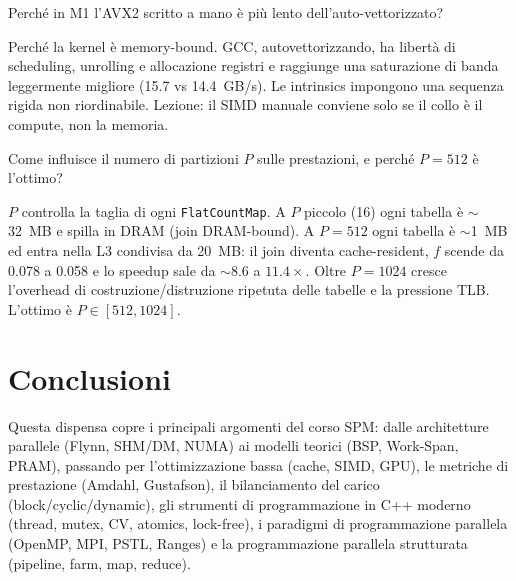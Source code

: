 \documentclass[11pt,a4paper]{article}
\theoremstyle{remark}
\newenvironment{esercizio}[1][]{%
  \begin{tcolorbox}[breakable,title={\textbf{Esercizio / Domanda d'esame}\ifx&#1&\else: #1\fi},
    colback=yellow!5!white, colframe=orange!75!black, fonttitle=\small\bfseries]%
}{%
  \end{tcolorbox}%
}
\newenvironment{risposta}{%
  \begin{tcolorbox}[breakable,title={\textbf{Risposta}},
    colback=green!5!white, colframe=green!50!black, fonttitle=\small\bfseries]%
}{%
  \end{tcolorbox}%
}
\begin{document}
\begin{esercizio}[9 -- SIMD a mano vs autovettorizzazione]
Perch\'e in M1 l'AVX2 scritto a mano \`e pi\`u lento dell'auto-vettorizzato?
\end{esercizio}
\begin{risposta}
Perch\'e la kernel \`e memory-bound. GCC, autovettorizzando, ha libert\`a di scheduling, unrolling e allocazione registri e raggiunge una saturazione di banda leggermente migliore (15.7 vs 14.4~GB/s). Le intrinsics impongono una sequenza rigida non riordinabile. Lezione: il SIMD manuale conviene solo se il collo \`e il compute, non la memoria.
\end{risposta}

\begin{esercizio}[10 -- Scelta di $P$]
Come influisce il numero di partizioni $P$ sulle prestazioni, e perch\'e $P=512$ \`e l'ottimo?
\end{esercizio}
\begin{risposta}
$P$ controlla la taglia di ogni \texttt{FlatCountMap}. A $P$ piccolo (16) ogni tabella \`e $\sim$32~MB e spilla in DRAM (join DRAM-bound). A $P=512$ ogni tabella \`e $\sim$1~MB ed entra nella L3 condivisa da 20~MB: il join diventa cache-resident, $f$ scende da 0.078 a 0.058 e lo speedup sale da $\sim$8.6 a $11.4\times$. Oltre $P=1024$ cresce l'overhead di costruzione/distruzione ripetuta delle tabelle e la pressione TLB. L'ottimo \`e $P\in[512,1024]$.
\end{risposta}


\clearpage
\section*{Conclusioni}

Questa dispensa copre i principali argomenti del corso SPM: dalle architetture parallele (Flynn, SHM/DM, NUMA) ai modelli teorici (BSP, Work-Span, PRAM), passando per l'ottimizzazione bassa (cache, SIMD, GPU), le metriche di prestazione (Amdahl, Gustafson), il bilanciamento del carico (block/cyclic/dynamic), gli strumenti di programmazione in C++ moderno (thread, mutex, CV, atomics, lock-free), i paradigmi di programmazione parallela (OpenMP, MPI, PSTL, Ranges) e la programmazione parallela strutturata (pipeline, farm, map, reduce).
\end{document}
